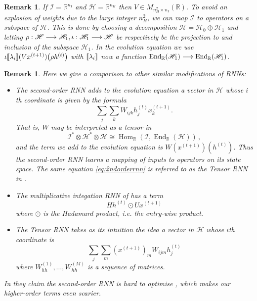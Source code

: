 \documentclass[english,letter paper,12pt,leqno]{article}
\theoremstyle{example}
\newtheorem{remark}[theorem]{Remark}
\numberwithin{equation}{section}
\def\Hom{\operatorname{Hom}}
\def\be{\begin{equation}}
\def\ee{\end{equation}}
\DeclareMathOperator{\End}{End}
\begin{document}
\begin{remark} If $\mathscr{I} = \mathbb{R}^{n_I}$ and $\mathscr{H} = \mathbb{R}^{n_H}$ then $V \in M_{n_H^2 \times n_I}(\mathbb{R})$. To avoid an explosion of weights due to the large integer $n_H^2$, we can map $\mathscr{I}$ to operators on a subspace of $\mathscr{H}$. This is done by choosing a decomposition $\mathscr{H} = \mathscr{H}_0 \oplus \mathscr{H}_1$ and letting $\rho: \mathscr{H} \longrightarrow \mathscr{H}_1, \iota: \mathscr{H}_1 \longrightarrow \mathscr{H}$ be respectively be the projection to and inclusion of the subspace $\mathscr{H}_1$. In the evolution equation we use $\iota \llbracket \lambda_i \rrbracket( Vx^{(t+1)} )\big( \rho h^{(t)} \big)$ with $\llbracket \lambda_i \rrbracket$ now a function $\End_{\mathbb{R}}(\mathscr{H}_1) \lto \End_{\mathbb{R}}(\mathscr{H}_1)$.
\end{remark}

\begin{remark} Here we give a comparison to other similar modifications of RNNs:
\begin{itemize}
\item The \emph{second-order RNN} \cite{highorderrec,pollack,firstvsecond,secondorder} adds to the evolution equation a vector in $\mathscr{H}$ whose $i$th coordinate is given by the formula
\be\label{eq:2ndorderrnn}
\sum_j \sum_k W_{ijk} h^{(t)}_j x^{(t+1)}_k.
\ee
That is, $W$ may be interpreted as a tensor in
\[
\mathscr{I}^* \otimes \mathscr{H}^* \otimes \mathscr{H} \cong \Hom_{\mathbb{R}}(\mathscr{I} , \End_{\mathbb{R}}(\mathscr{H}))\,,
\]
and the term we add to the evolution equation is $W(x^{(t+1)})(h^{(t)})$. Thus the second-order RNN learns a mapping of inputs to operators on its state space. The same equation \eqref{eq:2ndorderrnn} is referred to as the Tensor RNN in \cite{sutskever}.

\item The \emph{multiplicative integation} RNN of \cite{yuhai} has a term
\be
H h^{(t)} \odot U x^{(t+1)}
\ee
where $\odot$ is the Hadamard product, i.e. the entry-wise product. 

\item The Tensor RNN \cite{sutskever} takes as its intuition the idea a vector in $\mathscr{H}$ whose $i$th coordinate is
\[
\sum_j \sum_m (x^{(t+1)})_m W_{ijm} h^{(t)}_j
\]
where $W_{hh}^{(1)}, \ldots, W^{(M)}_{hh}$ is a sequence of matrices.

\end{itemize}
In \cite{yuhai} they claim the second-order RNN is hard to optimise \cite[p.8]{yuhai}, which makes our higher-order terms even scarier.
\end{remark}
\end{document}
